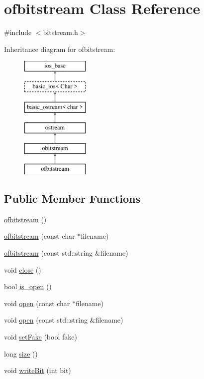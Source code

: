 \hypertarget{classofbitstream}{}\section{ofbitstream Class Reference}
\label{classofbitstream}


{\ttfamily \#include $<$bitstream.\+h$>$}

Inheritance diagram for ofbitstream\+:\begin{figure}[H]
\begin{center}
\leavevmode
\includegraphics[height=6.000000cm]{classofbitstream}
\end{center}
\end{figure}
\subsection*{Public Member Functions}
\begin{DoxyCompactItemize}
\item 
\mbox{\hyperlink{classofbitstream_a17657aa7e766554cdfd08cbed37d02e4}{ofbitstream}} ()
\item 
\mbox{\hyperlink{classofbitstream_a4f24be0f7b8620034f41673c9121f87d}{ofbitstream}} (const char $\ast$filename)
\item 
\mbox{\hyperlink{classofbitstream_a3743823306e8043638edf759f8864fab}{ofbitstream}} (const std\+::string \&filename)
\item 
void \mbox{\hyperlink{classofbitstream_a5ae591df94fc66ccb85cbb6565368bca}{close}} ()
\item 
bool \mbox{\hyperlink{classofbitstream_a2f57f54d8c03b615bb31eee091d8a88a}{is\+\_\+open}} ()
\item 
void \mbox{\hyperlink{classofbitstream_a57f80da790b202b27353cd8f8415b382}{open}} (const char $\ast$filename)
\item 
void \mbox{\hyperlink{classofbitstream_a72f6f3d1b9bc5a4275359cc0a83a60bd}{open}} (const std\+::string \&filename)
\item 
void \mbox{\hyperlink{classobitstream_ad916b4624eb09d375514964f867b475c}{set\+Fake}} (bool fake)
\item 
long \mbox{\hyperlink{classobitstream_a22727e9c338fb1aaa6722031445373c3}{size}} ()
\item 
void \mbox{\hyperlink{classobitstream_a487c88ba2560a4657d18c3edb7d9d247}{write\+Bit}} (int bit)
\end{DoxyCompactItemize}


